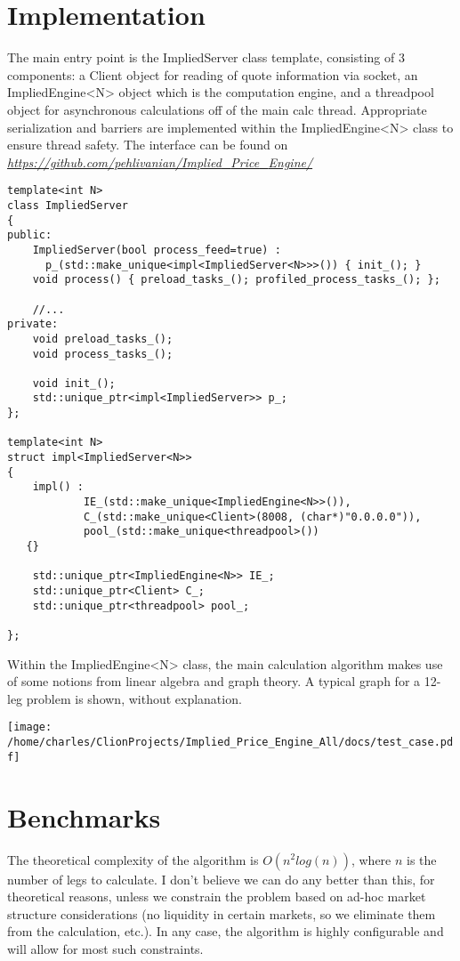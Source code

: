 \documentclass{article}
\begin{document}
\section*{Implementation}
The main entry point is the ImpliedServer class template, consisting of 3 components: a Client object for reading of quote information via socket, an ImpliedEngine<N> object which is the computation engine, and a threadpool object for asynchronous calculations off of the main calc thread. Appropriate serialization and barriers are implemented within the ImpliedEngine<N> class to ensure thread safety. The interface can be found on \href{https://github.com/pehlivanian/Implied{\_}Price{\_}Engine}{\it https://github.com/pehlivanian/Implied{\_}Price{\_}Engine/}

\begin{verbatim}
template<int N>
class ImpliedServer
{
public:
    ImpliedServer(bool process_feed=true) :
      p_(std::make_unique<impl<ImpliedServer<N>>>()) { init_(); }
    void process() { preload_tasks_(); profiled_process_tasks_(); };
 
    //...
private:
    void preload_tasks_();
    void process_tasks_();

    void init_();
    std::unique_ptr<impl<ImpliedServer>> p_;
};

template<int N>
struct impl<ImpliedServer<N>>
{
    impl() :
            IE_(std::make_unique<ImpliedEngine<N>>()),
            C_(std::make_unique<Client>(8008, (char*)"0.0.0.0")),
            pool_(std::make_unique<threadpool>()) 
   {}

    std::unique_ptr<ImpliedEngine<N>> IE_;
    std::unique_ptr<Client> C_;
    std::unique_ptr<threadpool> pool_;

};

\end{verbatim}

Within the ImpliedEngine<N> class, the main calculation algorithm makes use of some notions from linear algebra and graph theory. A typical graph for a 12-leg problem is shown, without explanation.

\texttt{[image: /home/charles/ClionProjects/Implied\_Price\_Engine\_All/docs/test\_case.pdf]}
\section*{Benchmarks}

The theoretical complexity of the algorithm is $O(n^2 log(n))$, where $n$ is the number of legs to calculate. I don't believe we can do any better than this, for theoretical reasons, unless we constrain the problem based on ad-hoc market structure considerations (no liquidity in certain markets, so we eliminate them from the calculation, etc.). In any case, the algorithm is highly configurable and will allow for most such constraints.
\end{document}
